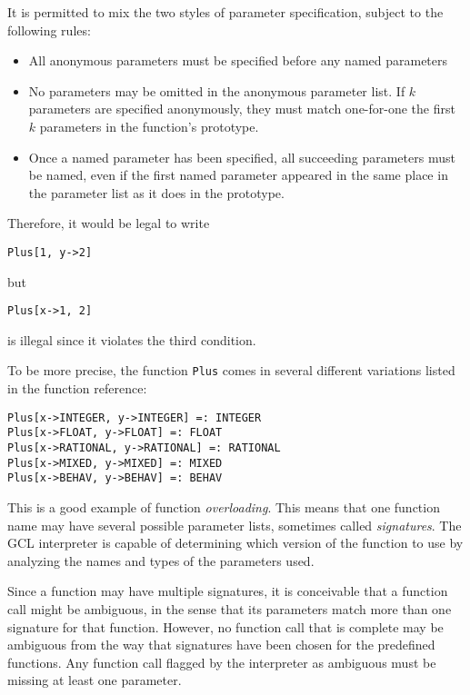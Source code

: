 It is permitted to mix the two styles of parameter specification,
subject to the following rules:

\begin{itemize}
\item All anonymous parameters must be specified before any named
parameters
\item No parameters may be omitted in the anonymous parameter list.
If $k$ parameters are specified anonymously, they must match
one-for-one the first $k$ parameters in the function's prototype.
\item Once a named parameter has been specified, all succeeding
parameters must be named, even if the first named parameter appeared
in the same place in the parameter list as it does in the prototype.
\end{itemize}

\noindent Therefore, it would be legal to write

\begin{verbatim}
Plus[1, y->2]
\end{verbatim}

\noindent but

\begin{verbatim}
Plus[x->1, 2]
\end{verbatim}

\noindent is illegal since it violates the third condition.

To be more precise, the function {\tt Plus} comes in several different
variations listed in the function reference:

\begin{verbatim}
Plus[x->INTEGER, y->INTEGER] =: INTEGER
Plus[x->FLOAT, y->FLOAT] =: FLOAT
Plus[x->RATIONAL, y->RATIONAL] =: RATIONAL
Plus[x->MIXED, y->MIXED] =: MIXED
Plus[x->BEHAV, y->BEHAV] =: BEHAV
\end{verbatim}

\noindent This is a good example of function {\it overloading}.  This
means that one function name may have several possible parameter
lists, sometimes called {\it signatures}.  The GCL interpreter is
capable of determining which version of the function to use by
analyzing the names and types of the parameters used.

Since a function may have multiple signatures, it is conceivable that
a function call might be ambiguous, in the sense that its parameters
match more than one signature for that function.  However, no function
call that is complete may be ambiguous from the way that signatures
have been chosen for the predefined functions.  Any function call
flagged by the interpreter as ambiguous must be missing at least one
parameter.

